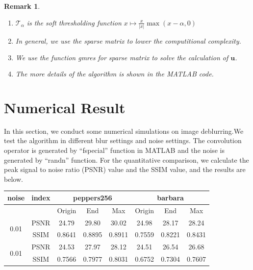 \documentclass{article}
\newtheorem{remark}{Remark}
\begin{document}
\begin{remark}
\begin{enumerate}
\item $\mathcal{T}_{\alpha}$ is the soft thresholding function $x \mapsto \frac{x}{|x|}\max(x-\alpha,0)$
\item In general, we use the sparse matrix to lower the computitional complexity.
\item We use the function gmres for sparse matrix to solve the calculation of $\bm{u}$.
\item The more details of the algorithm is shown in the MATLAB code.
\end{enumerate}
\end{remark}

\section{Numerical Result}
In this section, we conduct some numerical simulations on image deblurring.We test the algorithm in different blur settings and noise settings. The convolution operator is generated by “fspecial” function in MATLAB and the noise is generated by “randn” function. For the quantitative comparison, we calculate the peak signal to noise ratio (PSNR) value and the SSIM value, and the results are below. 
         
        \begin{center}
                   \begin{tabular}{|c|c|c|c|c|c|c|c|}
                      \hline
                       noise & index & \multicolumn{3}{|c|}{peppers256} & \multicolumn{3}{|c|}{barbara}\\
                      \hline
                         & & Origin & End & Max & Origin & End & Max \\
                      \hline
                       \multirow{2}{*}{0.01} 
                         & PSNR & 24.79 & 29.80 & 30.02 & 24.98 & 28.17 & 28.24 \\
                         & SSIM & 0.8641& 0.8895& 0.8911& 0.7559& 0.8221& 0.8431 \\
                      \hline
                       \multirow{2}{*}{0.01} 
                         & PSNR & 24.53 & 27.97 & 28.12 & 24.51 & 26.54 & 26.68 \\
                         & SSIM & 0.7566& 0.7977& 0.8031& 0.6752& 0.7304& 0.7607 \\ 
                      \hline
                   \end{tabular}
        \end{center}
\end{document}
